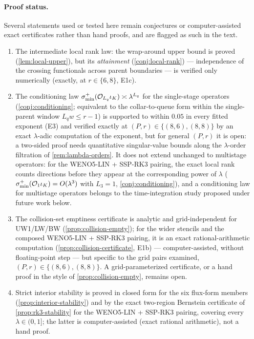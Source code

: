 \documentclass[pdflatex,sn-mathphys-num]{sn-jnl}%
\theoremstyle{thmstyleone}%
\theoremstyle{thmstyletwo}%
\theoremstyle{thmstylethree}%
\begin{document}
\paragraph{Proof status.}
Several statements used or tested here remain conjectures or computer-assisted exact certificates rather than hand proofs, and are flagged as such in the text.
\begin{enumerate}
\item[(i)] The intermediate local rank law: the wrap-around upper bound is proved (\cref{lem:local-upper}), but its \emph{attainment} (\cref{conj:local-rank}) --- independence of the crossing functionals across parent boundaries --- is verified only numerically (exactly, at $r\in\{6,8\}$, E1c).
\item[(ii)] The conditioning law $\sigma^{+}_{\min}({\cal O}_{L_q}\iota_K)\asymp\lambda^{L_q}$ for the single-stage operators (\cref{conj:conditioning}; equivalent to the collar-to-queue form within the single-parent window $L_qw\le r-1$) is supported to within $0.05$ in every fitted exponent (E3) and verified exactly at $(P,r)\in\{(8,6),(8,8)\}$ by an exact $\lambda$-adic computation of the exponent, but for general $(P,r)$ it is open: a two-sided proof needs quantitative singular-value bounds along the $\lambda$-order filtration of \cref{rem:lambda-orders}.
      It does not extend unchanged to multistage operators: for the WENO5-LIN + SSP-RK3 pairing, the exact local rank counts directions before they appear at the corresponding power of $\lambda$ ($\sigma^{+}_{\min}({\cal O}_1\iota_K)=O(\lambda^{3})$ with $L_3=1$, \cref{conj:conditioning}), and a conditioning law for multistage operators belongs to the time-integration study proposed under future work below.
\item[(iii)] The collision-set emptiness certificate is analytic and grid-independent for UW1/LW/BW (\cref{prop:collision-empty}); for the wider stencils and the composed WENO5-LIN + SSP-RK3 pairing, it is an exact rational-arithmetic computation (\cref{prop:collision-certificate}, E1b) --- computer-assisted, without floating-point step --- but specific to the grid pairs examined, $(P,r)\in\{(8,6),(8,8)\}$.
      A grid-parameterized certificate, or a hand proof in the style of \cref{prop:collision-empty}, remains open.
\item[(iv)] Strict interior stability is proved in closed form for the six flux-form members (\cref{prop:interior-stability}) and by the exact two-region Bernstein certificate of \cref{prop:rk3-stability} for the WENO5-LIN + SSP-RK3 pairing, covering every $\lambda\in(0,1]$; the latter is computer-assisted (exact rational arithmetic), not a hand proof.

\end{enumerate}
\end{document}
